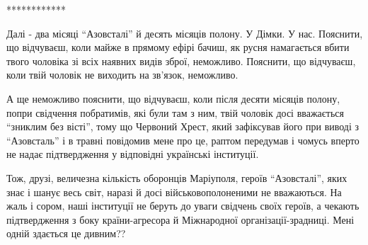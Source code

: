 ************

Далі - два місяці \enquote{Азовсталі} й десять місяців полону. У Дімки.
У нас. Пояснити, що відчуваєш, коли майже в прямому ефірі бачиш,
як русня намагається вбити твого чоловіка зі всіх наявних видів
зброї, неможливо. Пояснити, що відчуваєш, коли твій чоловік не
виходить на зв'язок, неможливо. 

А ще неможливо пояснити, що відчуваєш, коли після десяти
місяців полону, попри  свідчення побратимів, які були там з
ним, твій чоловік досі вважається \enquote{зниклим без вісті}, тому що
Червоний Хрест, який зафіксував його при виводі з \enquote{Азовсталь}
і в травні повідомив мене про це, раптом передумав і чомусь
вперто не надає підтвердження у відповідні українські
інституції. 

Тож, друзі, величезна кількість оборонців Маріуполя,
героїв \enquote{Азовсталі}, яких знає і шанує весь світ, наразі
й досі військовополоненими не вважаються. На жаль і
сором, наші інституції не беруть до уваги свідчень своїх
героїв, а чекають підтвердження з боку країни-агресора й
Міжнародної організації-зрадниці. Мені одній здається це
дивним??

